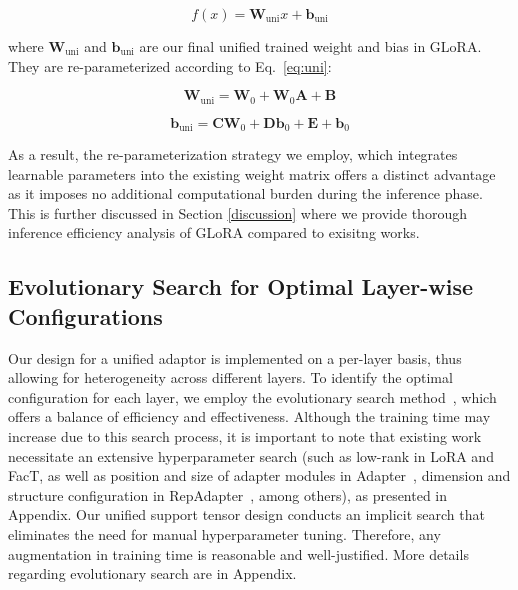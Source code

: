 \begin{equation}
f(x)=\mathbf{W}_\mathrm{uni}x+\mathbf{b}_\mathrm{uni}
\end{equation}

where $\mathbf{W}_\mathrm{uni}$ and $\mathbf{b}_\mathrm{uni}$ are our final unified trained weight and bias in GLoRA. They are re-parameterized according to Eq.~\ref{eq:uni}:

\begin{equation}
\mathbf{W}_\mathrm{uni}=\mathbf{W}_{0}+\mathbf{W}_{0} \mathbf{A}+\mathbf{B}
\end{equation}

\begin{equation}
\mathbf{b}_\mathrm{uni}=\mathbf{C} \mathbf{W}_{0}+\mathbf{D} \mathbf{b}_{0}+\mathbf{E}+\mathbf{b}_{0} 
\end{equation}

As a result, the re-parameterization strategy we employ, which integrates learnable parameters into the existing weight matrix offers a distinct advantage as it imposes no additional computational burden during the inference phase. This is further discussed in Section \ref{discussion} where we provide thorough inference efficiency analysis of GLoRA compared to exisitng works.

\subsection{Evolutionary Search for Optimal Layer-wise Configurations}

Our design for a unified adaptor is implemented on a per-layer basis, thus allowing for heterogeneity across different layers. To identify the optimal configuration for each layer, we employ the evolutionary search method~\citep{zhang2022neural, shen2021partial}, which offers a balance of efficiency and effectiveness. Although the training time may increase due to this search process, it is important to note that existing work~\citep{zhang2022neural} necessitate an extensive hyperparameter search (such as low-rank in LoRA and FacT, as well as position and size of adapter modules in Adapter~\citep{houlsby2019parameter}, dimension and structure configuration in RepAdapter~\citep{luo2023towards}, among others), as presented in Appendix. Our unified support tensor design conducts an implicit search that eliminates the need for manual hyperparameter tuning. Therefore, any augmentation in training time is reasonable and well-justified. More details regarding evolutionary search are in Appendix.


